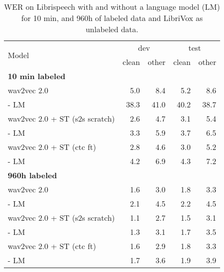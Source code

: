 \documentclass{article}
\newcommand{\wvpp}{wav2vec 2.0}
\newcommand{\vox}{LibriVox}
\newcommand{\libri}{Librispeech}
\begin{document}
\begin{table}[t]
\centering
\caption{WER on \libri{} with and without a language model (LM) for 10 min, and 960h of labeled data and \vox{} as unlabeled data.
}
\label{tab:lm}
\begin{tabular}{lrrrr}
\toprule
\multirow{2}{*}{Model} & \multicolumn{2}{c}{dev} & \multicolumn{2}{c}{test} \\
\cline{2-3}\cline{4-5} 
{} & clean & other & clean & other \\
\midrule
\midrule
\multicolumn{5}{l}{\textbf{10 min labeled}} \\
\wvpp{}~\cite{baevski2020wav} & 5.0 & 8.4 & 5.2 & 8.6 \\
\hspace{0.04in}- LM & 38.3 & 41.0 & 40.2 & 38.7 \\
\midrule
\wvpp{} + ST (s2s scratch) & 2.6 & 4.7 & 3.1 & 5.4  \\
\hspace{0.04in}- LM & 3.3 &	5.9	& 3.7 & 6.5 \\
\wvpp{} + ST (ctc ft) & 2.8 & 4.6 & 3.0 & 5.2 \\
\hspace{0.04in}- LM & 4.2 & 6.9	& 4.3 & 7.2 \\
\midrule
\midrule
\multicolumn{5}{l}{\textbf{960h labeled}} \\
wav2vec 2.0~\cite{baevski2020wav} & 1.6 & 3.0 & 1.8 & 3.3 \\
\hspace{0.04in}- LM &  2.1 & 4.5 & 2.2 & 4.5 \\
\midrule
\wvpp{} + ST (s2s scratch) & 1.1	& 2.7	& 1.5	& 3.1 \\
\hspace{0.04in}- LM & 1.3 &  3.1 &  1.7 &  3.5  \\
\wvpp{} + ST (ctc ft) & 1.6 & 2.9 & 1.8 & 3.3 \\
\hspace{0.04in}- LM & 1.7 & 3.6 & 1.9 & 3.9 \\
\bottomrule
\end{tabular}
\end{table}
\end{document}
